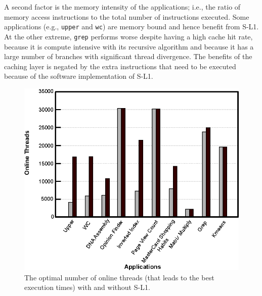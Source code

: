 A second factor is the memory intensity of the applications; i.e., the ratio of memory access instructions to the total number of instructions executed.
Some applications (e.g., \texttt{upper} and \texttt{wc}) are memory bound and hence benefit from S-L1.
At the other extreme, \texttt{grep} performs worse despite having a high cache hit rate,
because it is compute intensive with its recursive algorithm and because it has a large number of branches with significant thread divergence.
The benefits of the caching layer is negated by the extra instructions that need to be executed because of the software implementation of S-L1.


\begin{figure}[t]
\center
\includegraphics[scale=0.75]{8higherParallelism.eps}
\vspace{-0.0cm}
\caption{\footnotesize\textnormal{The optimal number of online threads (that leads to the best execution times) with and without S-L1.}}
\label{fig:levelprallelism}
\end{figure}

